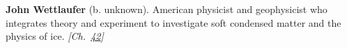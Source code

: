 \textbf{John Wettlaufer} (b. unknown). American physicist and geophysicist who integrates theory and experiment to investigate soft condensed matter and the physics of ice. \emph{[Ch.~\hyperref[ch:iceslipperiness]{42}]}

